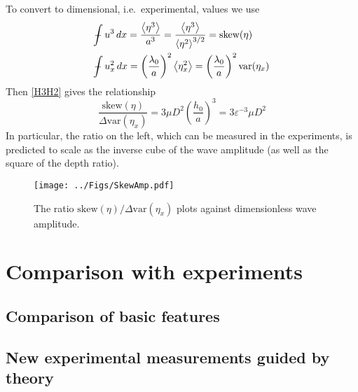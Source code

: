 \documentclass[11pt]{article}
\newcommand{\mean}[1]{\left< #1 \right>}
\newcommand{\eps}{\varepsilon}
\newcommand{\skw}{\text{skew}}
\newcommand{\var}{\text{var}}
\def\Xint#1{\mathchoice
   {\XXint\displaystyle\textstyle{#1}}%
   {\XXint\textstyle\scriptstyle{#1}}%
   {\XXint\scriptstyle\scriptscriptstyle{#1}}%
   {\XXint\scriptscriptstyle\scriptscriptstyle{#1}}%
   \!\int}
\def\XXint#1#2#3{{\setbox0=\hbox{$#1{#2#3}{\int}$}
     \vcenter{\hbox{$#2#3$}}\kern-.5\wd0}}
\def\dashint{\Xint-}
\newcommand{\intt}{\dashint}%
\newcommand{\dx}{\, dx}
\begin{document}
To convert to dimensional, i.e.~experimental, values we use
\begin{align}
& \intt u^3 \dx = \frac{\mean{\eta^3}}{a^3} = 
\frac{\mean{\eta^3}}{\mean{\eta^2}^{3/2}} = \skw(\eta) \\
& \intt u_x^2 \dx = \left(\frac{\lambda_0}{a} \right)^2 \mean{\eta_x^2} 
= \left(\frac{\lambda_0}{a} \right)^2 \var(\eta_x)
\end{align}
Then \eqref{H3H2} gives the relationship
\begin{equation}
\frac{\skw(\eta)}{\Delta \var(\eta_x)} =
3 \mu D^2 \left( \frac{h_0}{a} \right)^3 = 3 \eps^{-3} \mu D^2
\end{equation}
In particular, the ratio on the left, which can be measured in the experiments, is predicted to scale as the inverse cube of the wave amplitude (as well as the square of the depth ratio).

\begin{figure}%
\begin{center}
\texttt{[image: ../Figs/SkewAmp.pdf]}
\caption{\label{fig1} 
The ratio ${\skw(\eta)}/{\Delta \var(\eta_x)}$ plots against dimensionless wave amplitude.
}
\end{center}
\end{figure}


\section{Comparison with experiments}

\subsection{Comparison of basic features}

\subsection{New experimental measurements guided by theory}

%
%
\end{document}
